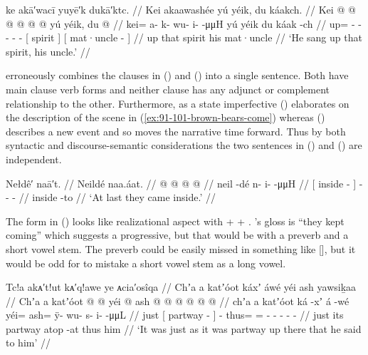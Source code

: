 \ex\label{ex:91-103-sing-up-spirit-uncle}%
%
\begingl
	\glpreamble	ke akā′wacī yuyē′k dukā′ktc. //
	\glpreamble	Kei akaawashée yú yéik, du káakch. //
	\gla	Kei @  @ {} @ {} @ {} @ {} @ {}
		{} yú yéik, {}
		{} du  @ {} {} //
	\glb	kei= a- k- wu- i-  -μμH
		{} yú yéik {}
		{} du káak -ch {} //
	\glc	up= - - - -  -
		{}[  spirit {}]
		{}[  mat·uncle - {}] //
	\gld	up  {} {} {} {} {}
		{} that spirit {}
		{} his mat·uncle {} {} //
	\glft	‘He sang up that spirit, his uncle.’
		//
\endgl
\xe

\citeauthor{swanton:1909} erroneously combines the clauses in (\blastx) and (\lastx) into a single sentence.
Both have main clause verb forms and neither clause has any adjunct or complement relationship to the other.
Furthermore, as a state imperfective (\blastx) elaborates on the description of the scene in (\ref{ex:91-101-brown-bears-come}) whereas (\lastx) describes a new event and so moves the narrative time forward.
Thus by both syntactic and discourse-semantic considerations the two sentences in (\blastx) and (\lastx) are independent.

\ex\label{ex:91-104-finally-came-inside}%
%
\begingl
	\glpreamble	Nełdê′ naā′t. //
	\glpreamble	Neildé naa.áat. //
	\gla	{}  @ {} {}
		 @ {} @ {} @ {} //
	\glb	{} neil -dé {}
		n- i-  -μμH //
	\glc	{}[ inside - {}]
		- -  - //
	\gld	{} inside -to {}
		 {} {} {} //
	\glft	‘At last they came inside.’
		//
\endgl
\xe

The form in (\lastx) looks like realizational aspect with  +  + .
\citeauthor{swanton:1909}’s gloss is “they kept coming” which suggests a progressive, but that would be  with a preverb and a short vowel stem.
The preverb could be easily missed in something like [], but it would be odd for \citeauthor{swanton:1909} to mistake a short vowel stem as a long vowel.

\ex\label{ex:91-105-partway-up-said-to-him}%
%
\begingl
	\glpreamble	Tc!a akᴀ′t!ut kᴀ′q!awe ye ᴀcia′osîqa //
	\glpreamble	Chʼa a katʼóot káxʼ áwé yéi ash yawsiḵaa //
	\gla	Chʼa {} a katʼóot  @ {} {}  @ {}
		yéi @ ash @  @ {} @ {} @ {} @ {} @ {} //
	\glb	chʼa {} a katʼóot ká -xʼ {} á -wé
		yéi= ash= ÿ- wu- s- i-  -μμL //
	\glc	just {}[  partway  - {}]  -
		thus= = - - - -  - //
	\gld	just {} its partway atop -at {}  {}
		thus\• him\•  {} {} {} {} {} //
	\glft	‘It was just as it was partway up there that he said to him’
		//
\endgl
\xe

